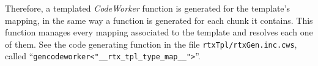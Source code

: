 \documentclass[american]{rtxreport}
\begin{document}
Therefore, a templated \emph{CodeWorker} function is generated for the
template's mapping, in the same way a function is generated for each chunk it
contains. This function manages every mapping associated to the template and
resolves each one of them. See the code generating function in the file
\texttt{rtxTpl/rtxGen.inc.cws}, called ``\texttt{gencodeworker<"\_\_rtx\_tpl\_type\_map\_\_">}''.



%
%
\end{document}
